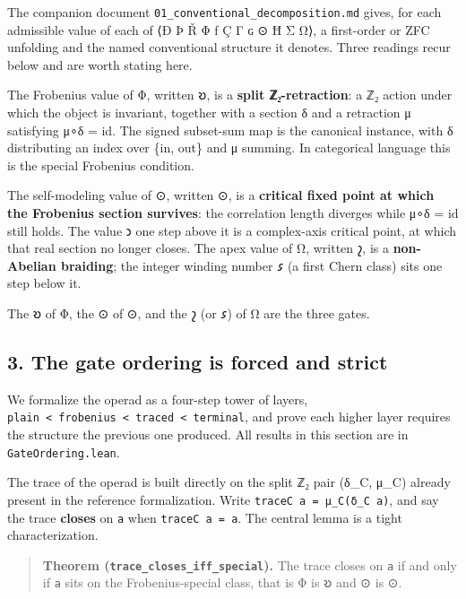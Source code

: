 The companion document \texttt{01\_conventional\_decomposition.md}
gives, for each admissible value of each of ⟨Ð Þ Ř Φ ƒ Ç Γ ɢ ⊙ Ħ Σ Ω⟩, a
first-order or ZFC unfolding and the named conventional structure it
denotes. Three readings recur below and are worth stating here.

The Frobenius value of Φ, written 𐑹, is a \textbf{split ℤ₂-retraction}:
a ℤ₂ action under which the object is invariant, together with a section
δ and a retraction μ satisfying μ∘δ = id. The signed subset-sum map is
the canonical instance, with δ distributing an index over \{in, out\}
and μ summing. In categorical language this is the special Frobenius
condition.

The self-modeling value of ⊙, written ⊙, is a \textbf{critical fixed
point at which the Frobenius section survives}: the correlation length
diverges while μ∘δ = id still holds. The value 𐑮 one step above it is a
complex-axis critical point, at which that real section no longer
closes. The apex value of Ω, written 𐑟, is a \textbf{non-Abelian
braiding}; the integer winding number 𐑭 (a first Chern class) sits one
step below it.

The 𐑹 of Φ, the ⊙ of ⊙, and the 𐑟 (or 𐑭) of Ω are the three gates.

\hypertarget{the-gate-ordering-is-forced-and-strict}{%
\subsection{3. The gate ordering is forced and
strict}\label{the-gate-ordering-is-forced-and-strict}}

We formalize the operad as a four-step tower of layers,
\texttt{plain\ \textless{}\ frobenius\ \textless{}\ traced\ \textless{}\ terminal},
and prove each higher layer requires the structure the previous one
produced. All results in this section are in \texttt{GateOrdering.lean}.

The trace of the operad is built directly on the split ℤ₂ pair (δ\_C,
μ\_C) already present in the reference formalization. Write
\texttt{traceC\ a\ =\ μ\_C(δ\_C\ a)}, and say the trace \textbf{closes}
on \texttt{a} when \texttt{traceC\ a\ =\ a}. The central lemma is a
tight characterization.

\begin{quote}
\textbf{Theorem (\texttt{trace\_closes\_iff\_special}).} The trace
closes on \texttt{a} if and only if \texttt{a} sits on the
Frobenius-special class, that is Φ is 𐑹 and ⊙ is ⊙.
\end{quote}

